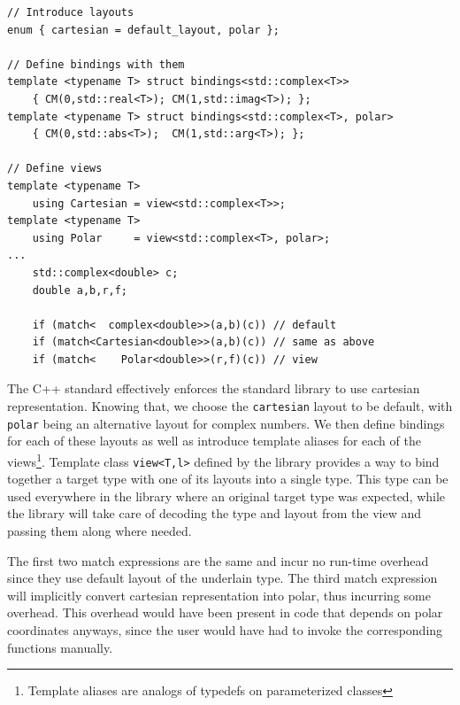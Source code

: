 \documentclass[preprint]{sigplanconf}
\makeatletter
\DeclareRobustCommand{\code}[1]{{\lstinline[breaklines=false,escapechar=@]{#1}}}
\makeatother
\begin{document}
\begin{lstlisting}
// Introduce layouts
enum { cartesian = default_layout, polar };

// Define bindings with them
template <typename T> struct bindings<std::complex<T>>
    { CM(0,std::real<T>); CM(1,std::imag<T>); };
template <typename T> struct bindings<std::complex<T>, polar>
    { CM(0,std::abs<T>);  CM(1,std::arg<T>); };

// Define views
template <typename T> 
    using Cartesian = view<std::complex<T>>;
template <typename T> 
    using Polar     = view<std::complex<T>, polar>;
...
    std::complex<double> c;
    double a,b,r,f;

    if (match<  complex<double>>(a,b)(c)) // default
    if (match<Cartesian<double>>(a,b)(c)) // same as above
    if (match<    Polar<double>>(r,f)(c)) // view
\end{lstlisting}

\noindent
The C++ standard effectively enforces the standard library to use cartesian 
representation\cite[-4]{C++0x}. Knowing that, we choose the 
\code{cartesian} layout to be default, with \code{polar} being an alternative 
layout for complex numbers. We then define bindings for each of these layouts as 
well as introduce template aliases for each of the views\footnote{Template 
aliases are analogs of typedefs on parameterized classes}. Template class 
\code{view<T,l>} defined by the library provides a way to bind together a target 
type with one of its layouts into a single type. This type can be used 
everywhere in the library where an original target type was expected, while the  
library will take care of decoding the type and layout from the view and passing 
them along where needed.

The first two match expressions are the same and incur no run-time overhead 
since they use default layout of the underlain type. The third match expression 
will implicitly convert cartesian representation into polar, thus incurring some 
overhead. This overhead would have been present in code that depends on polar 
coordinates anyways, since the user would have had to invoke the corresponding 
functions manually.

\end{document}
